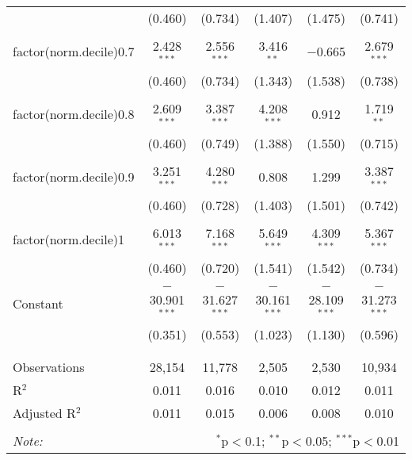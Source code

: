 \begin{table}[!htbp]
\begin{tabular}{@{\extracolsep{5pt}}lccccc}
  & (0.460) & (0.734) & (1.407) & (1.475) & (0.741) \\ 
  & & & & & \\ 
 factor(norm.decile)0.7 & 2.428$^{***}$ & 2.556$^{***}$ & 3.416$^{**}$ & $-$0.665 & 2.679$^{***}$ \\ 
  & (0.460) & (0.734) & (1.343) & (1.538) & (0.738) \\ 
  & & & & & \\ 
 factor(norm.decile)0.8 & 2.609$^{***}$ & 3.387$^{***}$ & 4.208$^{***}$ & 0.912 & 1.719$^{**}$ \\ 
  & (0.460) & (0.749) & (1.388) & (1.550) & (0.715) \\ 
  & & & & & \\ 
 factor(norm.decile)0.9 & 3.251$^{***}$ & 4.280$^{***}$ & 0.808 & 1.299 & 3.387$^{***}$ \\ 
  & (0.460) & (0.728) & (1.403) & (1.501) & (0.742) \\ 
  & & & & & \\ 
 factor(norm.decile)1 & 6.013$^{***}$ & 7.168$^{***}$ & 5.649$^{***}$ & 4.309$^{***}$ & 5.367$^{***}$ \\ 
  & (0.460) & (0.720) & (1.541) & (1.542) & (0.734) \\ 
  & & & & & \\ 
 Constant & $-$30.901$^{***}$ & $-$31.627$^{***}$ & $-$30.161$^{***}$ & $-$28.109$^{***}$ & $-$31.273$^{***}$ \\ 
  & (0.351) & (0.553) & (1.023) & (1.130) & (0.596) \\ 
  & & & & & \\ 
\hline \\[-1.8ex] 
Observations & 28,154 & 11,778 & 2,505 & 2,530 & 10,934 \\ 
R$^{2}$ & 0.011 & 0.016 & 0.010 & 0.012 & 0.011 \\ 
Adjusted R$^{2}$ & 0.011 & 0.015 & 0.006 & 0.008 & 0.010 \\ 
\hline 
\hline \\[-1.8ex] 
\textit{Note:}  & \multicolumn{5}{r}{$^{*}$p$<$0.1; $^{**}$p$<$0.05; $^{***}$p$<$0.01} \\ 
\end{tabular} 
\end{table} 
